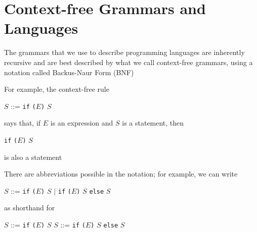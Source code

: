 \documentclass[8pt,a4paper,compress,handout]{beamer}
\newcommand{\mm}[1]{$#1$}
\newenvironment{spaced}
{
\smallskip
\hspace{.5cm}
\begin{minipage}[c]{\textwidth}
}
{
\end{minipage}
\smallskip
}
\begin{document}
\section{Context-free Grammars and Languages}
\begin{frame}[fragile]
\pause

The grammars that we use to describe programming languages are inherently recursive and are best described by what we call context-free grammars, using a notation called Backus-Naur Form (BNF)

\pause
\bigskip

For example, the context-free rule

\text{ }
\begin{spaced}
\begin{production}
\mm{S} ::=  \lstinline{if} \lstinline{(}\mm{E}\lstinline{)} \mm{S}
\end{production}
\end{spaced}

\noindent says that, if \mm{E} is an expression and \mm{S} is a statement, then 

\text{ }
\begin{spaced}
\begin{production}
\lstinline{if} \lstinline{(}\mm{E}\lstinline{)} \mm{S}
\end{production}
\end{spaced}

\noindent is also a statement

\pause
\bigskip

There are abbreviations possible in the notation; for example, we can write

\text{ }
\begin{spaced}
\begin{production}
\mm{S} ::= \lstinline{if} \lstinline{(}\mm{E}\lstinline{)} \mm{S}
      \mm{|} \lstinline{if} \lstinline{(}\mm{E}\lstinline{)} \mm{S} \lstinline{else} \mm{S}
\end{production}
\end{spaced}

\noindent as shorthand for

\text{ }
\begin{spaced}
\begin{production}
\mm{S} ::= \lstinline{if} \lstinline{(}\mm{E}\lstinline{)} \mm{S}
\mm{S} ::= \lstinline{if} \lstinline{(}\mm{E}\lstinline{)} \mm{S} \lstinline{else} \mm{S}
\end{production}
\end{spaced}
\end{frame}
\end{document}
